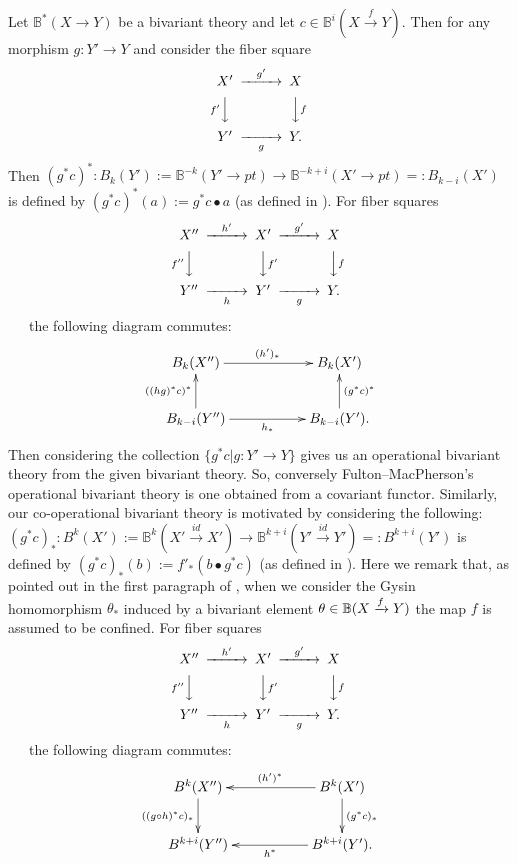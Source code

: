 \documentclass[a4paper]{amsart}
\begin{document}
\begin{rem} Let $\mathbb B^*(X \to Y)$ be a bivariant theory and let $c \in \mathbb B^i(X \xrightarrow f Y)$.
Then for any morphism $g:Y' \to Y$ and consider the fiber square
$$\CD
X' @> {g'}  >> X\\
@V {f'} VV @VV fV\\
Y' @>> {g} > Y.\\
\endCD
$$
Then $(g^*c)^*: B_k(Y'):=\mathbb B^{-k}(Y' \to pt) \to  \mathbb B^{-k+i}(X' \to pt) =:B_{k-i}(X')$
is defined by $(g^*c)^*(a):=g^*c \bullet a$ (as defined in \cite[\S 2.5 Gysin homomorphisms]{FM}). For fiber squares
$$\CD
X'' @> {h'}  >> X' @> {g'}  >> X\\
@V {f''} VV @VV f'V @VV fV\\
Y'' @>> {h} > Y' @>> {g} > Y.\\
\endCD
$$ \, \, \, 
the following diagram commutes:
$$
\xymatrix
{B_k(X'') \ar[rr]^{(h')_*} && B_k(X') \\
 B_{k-i}(Y'') \ar[u]^{((hg)^*c)^*}  \ar[rr]_{h_*} && B_{k-i}(Y') \ar[u]_{(g^*c)^*}.
}
$$ 
Then considering the collection $\{ g^*c | g:Y' \to Y\}$ gives us an operational bivariant theory from the given bivariant theory. So, conversely Fulton--MacPherson's operational bivariant theory is one obtained from a covariant functor. Similarly, our co-operational bivariant theory is motivated by considering the following:
$(g^*c)_*: B^k(X'):=\mathbb B^k(X' \xrightarrow {id} X') \to \mathbb B^{k+i}(Y' \xrightarrow {id} Y') =: B^{k+i}(Y')$
is defined by $(g^*c)_*(b):=f'_*(b \bullet g^*c)$ (as defined in \cite[\S 2.5 Gysin homomorphisms]{FM}). Here we remark that, as pointed out in the first paragraph of \cite[\S 2.5 Gysin homomorphisms, p.26]{FM}, when we consider the Gysin homomorphism $\theta_*$ induced by a bivariant element $\theta \in \mathbb B (X \xrightarrow f Y)$ the map $f$ is assumed to be confined. For fiber squares
$$\CD
X'' @> {h'}  >> X' @> {g'}  >> X\\
@V {f''} VV @VV f'V @VV fV\\
Y'' @>> {h} > Y' @>> {g} > Y.\\
\endCD
$$ \, \, \, 
the following diagram commutes:
$$
\xymatrix
{B^k(X'') \ar[d]_{((g\circ h)^*c)_*} && B^k(X')\ar[ll]_{(h')^*} \ar[d]^{(g^*c)_*}\\
 B^{k+i}(Y'') && B^{k+i}(Y') \ar[ll]^{h^*}.
}
$$  
\end{rem}
\end{document}
